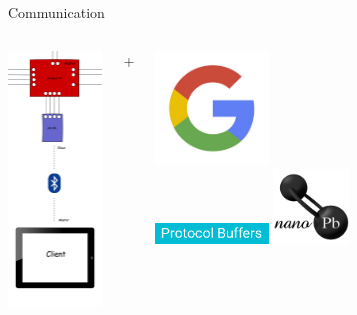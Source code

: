 \documentclass{beamer}
\begin{document}
	\begin{frame}{Communication}
		\begin{columns}
				\begin{center}
					\includegraphics[width=2.5cm]{pic/communication.png}
				\end{center}
				{\Huge{+}}
				\begin{center}
					\includegraphics[width=3cm]{pic/google.jpg}\\
					\includegraphics[width=3cm]{pic/protobuf.png}
					\vspace{0.7cm}
					\includegraphics[width=2cm]{pic/nanopb.png}
				\end{center}
		\end{columns}
	\end{frame}
\end{document}
